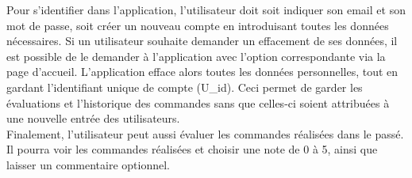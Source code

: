 \documentclass[10pt, a4paper]{article}
\begin{document}
Pour s'identifier dans l'application, l'utilisateur doit soit indiquer son email et son mot de passe, soit créer un nouveau 
compte en introduisant toutes les données nécessaires. Si un utilisateur souhaite demander un effacement de ses données,
il est possible de le demander à l'application avec l'option correspondante via la page d'accueil. L'application efface 
alors toutes les données personnelles, tout en gardant l'identifiant unique de compte (U\_id). Ceci permet de garder les évaluations 
et l'historique des commandes sans que celles-ci soient attribuées à une nouvelle entrée des utilisateurs. \\

Finalement, l'utilisateur peut aussi évaluer les commandes réalisées dans le passé. Il pourra voir les commandes réalisées 
et choisir une note de 0 à 5, ainsi que laisser un commentaire optionnel.
\end{document}
